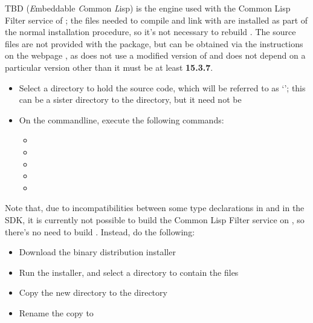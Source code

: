 \tertiaryEnd
{}
TBD
\tertiaryEnd
\secondaryEnd
{}
\textbf{\ECL} (\textit{E}mbeddable \textit{C}ommon \textit{L}isp) is the
 engine used with the Common Lisp Filter service of \mplusm{}; the
files needed to compile and link with \textbf{\ECL} are installed as part of the normal
\mplusm{} installation procedure, so it's not necessary to rebuild \textbf{\ECL}.
The source files are not provided with the  package, but can be obtained
via the instructions on the web\longDash{}page
, as
\mplusm{} does not use a modified version of \textbf{\ECL} and does not depend on a
particular version \longDash{} other than it must be at least \textbf{15.3.7}.
\begin{itemize}
\item Select a directory to hold the \textbf{\ECL} source code, which will be referred to
as `'; this can be a sister directory to the 
directory, but it need not be
\item\exSp{}On the command\longDash{}line, execute the following commands:
\begin{itemize}
\item{}
\item\exSp{}
\item\exSp{}
\item\exSp{}
\item\exSp{}
\end{itemize}
\end{itemize}
\tertiaryEnd
{}
Note that, due to incompatibilities between some type declarations in \textbf{\ECL} and in
the \win{} SDK, it is currently not possible to build the Common Lisp Filter service on
\win, so there's no need to build \textbf{\ECL}.
Instead, do the following:
\begin{itemize}
\item Download the
{\win{} binary distribution installer}
\item\exSp{}Run the installer, and select a directory to contain the \ECL{} files
\item\exSp{}Copy the new directory to the directory
\item\exSp{}Rename the copy to 
\end{itemize}

